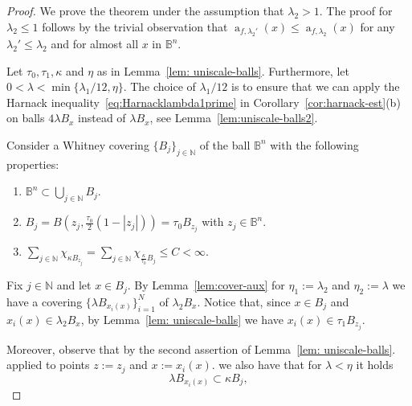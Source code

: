 \documentclass[11pt,a4paper,reqno]{amsart}
\theoremstyle{definition}
\renewcommand{\a}{\operatorname{a}}
\newcommand{\B}{\mathbb{B}^n}
\newcommand{\N}{\mathbb{N}}
\numberwithin{komcounter}{section}
\begin{document}
 \begin{proof}
 We prove the theorem under the assumption that $\lambda_2>1$. The proof for $\lambda_2\leq 1$ follows by the trivial observation that $\a_{f,\lambda_2'}(x)\leq \a_{f, \lambda_2}(x)$ for any $\lambda_2'\leq \lambda_2$ and for almost all $x$ in $\B$.

 
Let $\tau_0, \tau_1, \kappa$ and $\eta$ as in Lemma~\ref{lem: uniscale-balls}. Furthermore, let $0<\lambda <\min \{ \lambda_1/12, \eta \}$. The choice of $\lambda_1/12$ is to ensure that we can apply the Harnack inequality~\eqref{eq:Harnacklambda1prime} in Corollary~\ref{cor:harnack-est}(b) on balls $4\lambda B_x$ instead of $\lambda B_x$, see Lemma~\ref{lem:uniscale-balls2}. 

Consider a Whitney covering $\{ B_j\}_{j\in\N}$ of the ball $\B$ with the following properties:
\begin{enumerate}
	\item $\displaystyle \B\subset\bigcup_{j\in\N}B_j$.
	\item $B_j=B(z_j, \frac{\tau_0}{2} (1-|z_j|))=\tau_0 B_{z_j}$ with $z_j\in \B$.
	\item $\displaystyle \sum_{j\in\N}\chi_{\kappa B_{z_j}} = \sum_{j\in\N}\chi_{\frac{\kappa }{\tau_0}B_{j}} \leq C<\infty $.
\end{enumerate}

Fix $j\in\N$ and let $x\in B_j$. By Lemma~\ref{lem:cover-aux} for $\eta_1:=\lambda_2$ and $\eta_2:=\lambda$ we have a covering $\{ \lambda B_{x_i(x)}\}_{i=1}^N$ of $\lambda_2B_x$. Notice that, since $x\in B_j$ and $x_i(x)\in \lambda_2B_x$, by Lemma~\ref{lem: uniscale-balls} we have $x_i(x)\in \tau_1 B_{z_j}$.

Moreover, observe that by the second assertion of Lemma~\ref{lem: uniscale-balls}. applied to points $z:=z_j$ and $x:=x_i(x)$. we also have that
for $\lambda<\eta$ it holds 
\begin{equation}\label{thm36-aux1}
\lambda B_{x_i(x)}\subset \kappa B_j,
\end{equation}


\end{proof}
\end{document}

